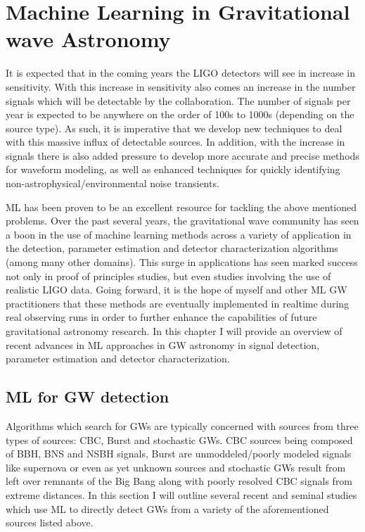 \chapter{Machine Learning in Gravitational wave Astronomy}


%
%
It is expected that in the coming years the \ac{LIGO} detectors will see in increase in sensitivity. With this increase in sensitivity also comes an increase in the number signals which will be detectable by the collaboration. The number of signals per year is expected to be anywhere on the order of 100s to 1000s (depending on the source type). As such, it is imperative that we develop new techniques to deal with this massive influx of detectable sources. In addition, with the increase in signals there is also added pressure to develop more accurate and precise methods for waveform modeling, as well as enhanced techniques for quickly identifying non-astrophysical/environmental noise transients.

\ac{ML} has been proven to be an excellent resource for tackling the above mentioned problems. Over the past several years, the gravitational wave community has seen a boon in the use of machine learning methods across a variety of application in the detection, parameter estimation and detector characterization algorithms (among many other domains). This surge in applications has seen marked success not only in proof of principles studies, but even studies involving the use of realistic \ac{LIGO} data. Going forward, it is the hope of myself and other \ac{ML} \ac{GW} practitioners that these methods are eventually implemented in realtime during real observing runs in order to further enhance the capabilities of future gravitational astronomy research. In this chapter I will provide an overview of recent advances in \ac{ML} approaches in \ac{GW} astronomy in signal detection, parameter estimation and detector characterization.

\section{ML for GW detection}

Algorithms which search for \ac{GW}s are typically concerned with sources from three types of sources: \ac{CBC}, Burst and stochastic \ac{GW}s. \ac{CBC} sources being composed of \ac{BBH}, \ac{BNS} and \ac{NSBH} signals, Burst are unmoddeled/poorly modeled signals like supernova or even as yet unknown sources and stochastic \ac{GW}s result from left over remnants of the Big Bang along with poorly resolved \ac{CBC} signals from extreme distances. In this section I will outline several recent and seminal studies which use \ac{ML} to directly detect \ac{GW}s from a variety of the aforementioned sources listed above.

